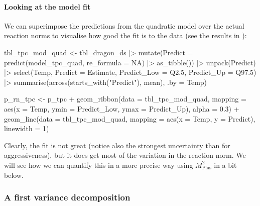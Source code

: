 \documentclass[a4paper,12pt,twoside]{article}
\begin{document}
\paragraph{Looking at the model fit}
We can superimpose the predictions from the quadratic model over the actual reaction norms to visualise how good the fit is to the data (see the results in ):
\begin{Rinput}
tbl_tpc_mod_quad <-
    tbl_dragon_ds |>
    mutate(Predict = predict(model_tpc_quad, re_formula = NA) |>
                     as_tibble()) |>
    unpack(Predict) |>
    select(Temp,
           Predict = Estimate,
           Predict_Low = Q2.5,
           Predict_Up  = Q97.5) |>
    summarise(across(starts_with("Predict"), mean),
              .by = Temp)

p_rn_tpc <-
    p_tpc +
    geom_ribbon(data = tbl_tpc_mod_quad,
                mapping = aes(x = Temp, ymin = Predict_Low, ymax = Predict_Up),
                alpha = 0.3) +
    geom_line(data = tbl_tpc_mod_quad,
              mapping = aes(x = Temp, y = Predict),
              linewidth = 1)
\end{Rinput}
Clearly, the fit is not great (notice also the strongest uncertainty than for aggressiveness), but it does get most of the variation in the reaction norm.
We will see how we can quantify this in a more precise way using $M^{2}_{\text{Plas}}$ in a bit below.

\subsubsection{A first variance decomposition}
\end{document}

